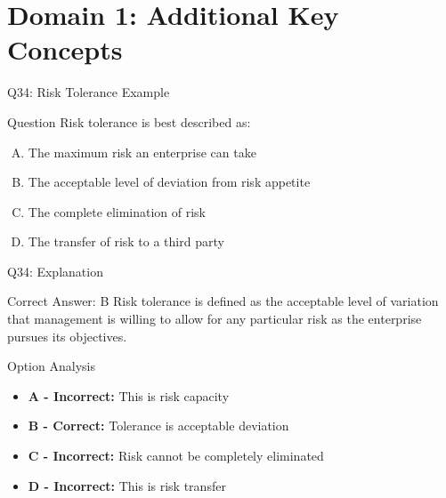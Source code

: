 \documentclass{beamer}
\begin{document}
	\section{Domain 1: Additional Key Concepts}
	

	
	\begin{frame}{Q34: Risk Tolerance Example}
		\begin{block}{Question}
			Risk tolerance is best described as:
		\end{block}
		\begin{enumerate}[(A)]
			\item The maximum risk an enterprise can take
			\item The acceptable level of deviation from risk appetite
			\item The complete elimination of risk
			\item The transfer of risk to a third party
		\end{enumerate}
	\end{frame}
	
	\begin{frame}{Q34: Explanation}
		\begin{block}{Correct Answer: B}
			Risk tolerance is defined as the acceptable level of variation that management is willing to allow for any particular risk as the enterprise pursues its objectives.
		\end{block}
		\begin{block}{Option Analysis}
			\begin{itemize}
				\item \textbf{A - Incorrect:} This is risk capacity
				\item \textbf{B - Correct:} Tolerance is acceptable deviation
				\item \textbf{C - Incorrect:} Risk cannot be completely eliminated
				\item \textbf{D - Incorrect:} This is risk transfer
			\end{itemize}
		\end{block}
	\end{frame}
	
\end{document}
